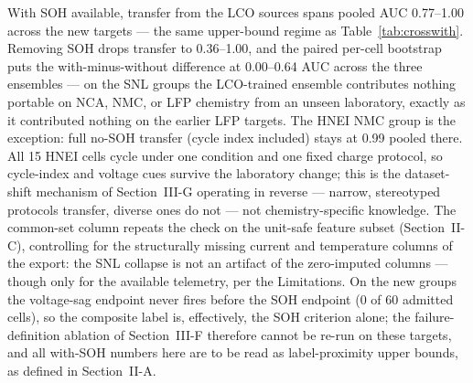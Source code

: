 With SOH available, transfer from the LCO sources spans pooled AUC 0.77--1.00 across the new targets --- the same upper-bound regime as Table~\ref{tab:crosswith}. Removing SOH drops transfer to 0.36--1.00, and the paired per-cell bootstrap puts the with-minus-without difference at 0.00--0.64 AUC across the three ensembles --- on the SNL groups the LCO-trained ensemble contributes nothing portable on NCA, NMC, or LFP chemistry from an unseen laboratory, exactly as it contributed nothing on the earlier LFP targets. The HNEI NMC group is the exception: full no-SOH transfer (cycle index included) stays at 0.99 pooled there. All 15 HNEI cells cycle under one condition and one fixed charge protocol, so cycle-index and voltage cues survive the laboratory change; this is the dataset-shift mechanism of Section~III-G operating in reverse --- narrow, stereotyped protocols transfer, diverse ones do not --- not chemistry-specific knowledge. The common-set column repeats the check on the unit-safe feature subset (Section~II-C), controlling for the structurally missing current and temperature columns of the export: the SNL collapse is not an artifact of the zero-imputed columns --- though only for the available telemetry, per the Limitations. On the new groups the voltage-sag endpoint never fires before the SOH endpoint (0 of 60 admitted cells), so the composite label is, effectively, the SOH criterion alone; the failure-definition ablation of Section~III-F therefore cannot be re-run on these targets, and all with-SOH numbers here are to be read as label-proximity upper bounds, as defined in Section~II-A.

